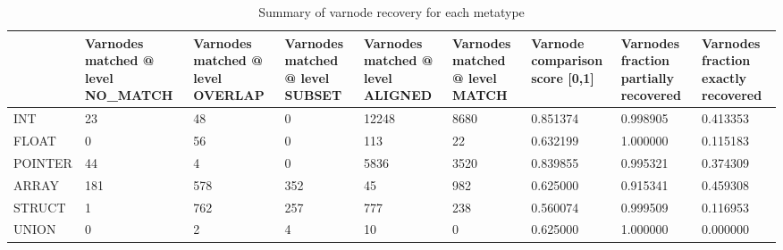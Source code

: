 \begin{table}[t]
\centering
\caption{Summary of varnode recovery for each metatype}
\label{table:metatype-recovery-summary-with-levels}
\begin{tabular}{lp{2.2cm}p{2.2cm}p{2.2cm}p{2.2cm}p{2.2cm}p{2.2cm}p{2.2cm}p{2.2cm}}
\toprule
{} &  Varnodes matched @ level NO\_MATCH &  Varnodes matched @ level OVERLAP &  Varnodes matched @ level SUBSET &  Varnodes matched @ level ALIGNED &  Varnodes matched @ level MATCH &  Varnode comparison score [0,1] &  Varnodes fraction partially recovered &  Varnodes fraction exactly recovered \\
\midrule
INT     &                                 23 &                                48 &                                0 &                             12248 &                            8680 &                        0.851374 &                               0.998905 &                             0.413353 \\
FLOAT   &                                  0 &                                56 &                                0 &                               113 &                              22 &                        0.632199 &                               1.000000 &                             0.115183 \\
POINTER &                                 44 &                                 4 &                                0 &                              5836 &                            3520 &                        0.839855 &                               0.995321 &                             0.374309 \\
ARRAY   &                                181 &                               578 &                              352 &                                45 &                             982 &                        0.625000 &                               0.915341 &                             0.459308 \\
STRUCT  &                                  1 &                               762 &                              257 &                               777 &                             238 &                        0.560074 &                               0.999509 &                             0.116953 \\
UNION   &                                  0 &                                 2 &                                4 &                                10 &                               0 &                        0.625000 &                               1.000000 &                             0.000000 \\
\bottomrule
\end{tabular}
\end{table}
